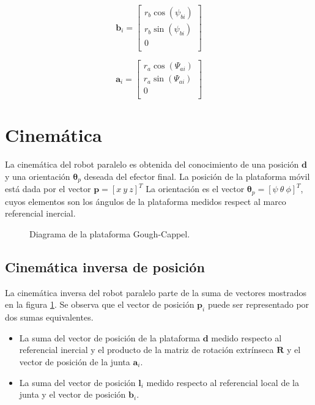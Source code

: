 \begin{equation} \label{eq: p_b}
\mathbf b_i = \begin{bmatrix}
r_b\cos(\psi_{bi})\\
r_b\sin(\psi_{bi})\\
0\\
\end{bmatrix}
\end{equation}

\begin{equation} \label{eq: p_a}
\mathbf a_i = \begin{bmatrix}
r_a\cos(\Psi_{ai})\\
r_a\sin(\Psi_{ai})\\
0\\
\end{bmatrix}
\end{equation}

\section{Cinemática}

La cinemática del robot paralelo es obtenida del conocimiento de una posición $\mathbf d$
y una orientación $\mathbf \theta_p$ deseada del efector final.
La posición de la plataforma móvil está dada por el vector $\mathbf p = [x \ y \ z]^T$
La orientación es el vector $\boldsymbol \theta_p = [\psi \ \theta \ \phi]^T$, 
cuyos elementos son los ángulos de la plataforma medidos respect al marco referencial inercial.

\begin{figure}[htb!]
    \centering
    \caption{Diagrama de la plataforma Gough-Cappel.}
    \label{fig: gough stewart diagram}
\end{figure}

\subsection{Cinemática inversa de posición}

La cinemática inversa del robot paralelo parte de la suma de vectores 
mostrados en la figura \ref{fig: gough stewart diagram}.
Se observa que el vector de posición $\mathbf p_i$ puede ser representado 
por dos sumas equivalentes. 
\begin{itemize}
 \item La suma del vector de posición de la plataforma $\mathbf d$ 
medido respecto al referencial inercial y el producto de 
la matriz de rotación extrínseca $\mathbf R$ y el vector de posición 
de la junta $\mathbf a_i$. 
 \item La suma del vector de posición $\mathbf l_i$ medido respecto 
 al referencial local de la junta y el vector de posición $\mathbf b_i$.
\end{itemize}

